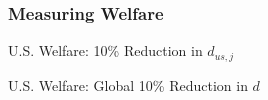\documentclass[9pt,pdftex,aspectratio=1610]{beamer}
\theoremstyle{definition}
\begin{document}
\begin{frame}[t]
\frametitle{Measuring Welfare}
\smallskip


\end{frame}


\begin{frame}[t]{U.S. Welfare: 10\% Reduction in $d_{us,j}$}
\begin{figure}[!t]
\end{figure}
\end{frame}


\begin{frame}[t]{U.S. Welfare: Global 10\% Reduction in $d$ }
\begin{figure}[!t]
\end{figure}
\end{frame}
\end{document}
